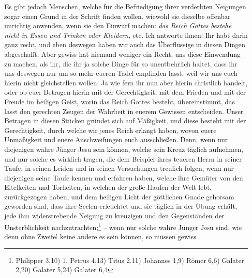  Es gibt jedoch Menschen, welche für die
Befriedigung ihrer verderbten Neigungen
sogar einen Grund in der Schrift finden wollen, wiewohl sie dieselbe offenbar
unrichtig anwenden, wenn sie den Einwurf machen:
\textit{das Reich Gottes bestehe nicht
in Essen und Trinken oder Kleidern,} etc. Ich antworte ihnen: Ihr habt darin
ganz
recht, und eben deswegen haben wir auch das Überflüssige in diesen Dingen
abgeschafft. Aber gewiss hat niemand weniger ein Recht, uns diese Einwendung zu
machen, als ihr, die ihr ja solche Dinge für so unentbehrlich haltet, dass ihr
uns deswegen nur um so mehr eueren Tadel empfinden lasst, weil wir uns euch
hierin nicht gleichstellen wollen. Ja wie fern ihr nun aber hierin christlich
handelt, oder ob euer Betragen hierin mit der Gerechtigkeit, mit dem Frieden und
mit der Freude im heiligen Geist, worin das
Reich Gottes besteht,
übereinstimmt, das lasst den gerechten Zeugen der Wahrheit in
euerem Gewissen
entscheiden. Unser Betragen in diesen Stücken gründet sich auf Mäßigkeit, und
diese besteht mit der Gerechtigkeit, durch welche wir jenes Reich
erlangt
haben, wovon euere Unmäßigkeit und euere Auschweifungen euch ausschließen. Denn,
wenn nur diejenigen wahre Jünger Jesu sein können, welche sein
Kreuz täglich
aufnehmen, und nur solche es wirklich tragen, die dem Beispiel ihres teueren
Herrn in seiner Taufe, in seinen Leiden und in seinen Versuchungen
treulich
folgen, wenn nur diejenigen seine Taufe kennen und erfahren haben, welche ihre
Gemüter von den Eitelkeiten und Torheiten, in welchen der große Haufen der Welt
lebt, zurückgezogen haben, und dem heiligen Licht der göttlichen
Gnade gehorsam
geworden sind, dass ihre Seelen erleuchtet und sie täglich in der Übung erhält,
jede ihm widerstrebende Neigung zu kreuzigen und den
Gegenständen der
Unsterblichkeit nachzutrachten;\footnote{Philipper 3,10)
1. Petrus 4,13)
Titus 2,11)
Johannes 1,9)
Römer 6,6)
Galater 2,20)
Galater 5,24)
Galater 6,4}
-- wenn nur solche wahre Jünger
Jesu sind, wie denn ohne Zweifel keine andere es sein können, so müssen gewiss
